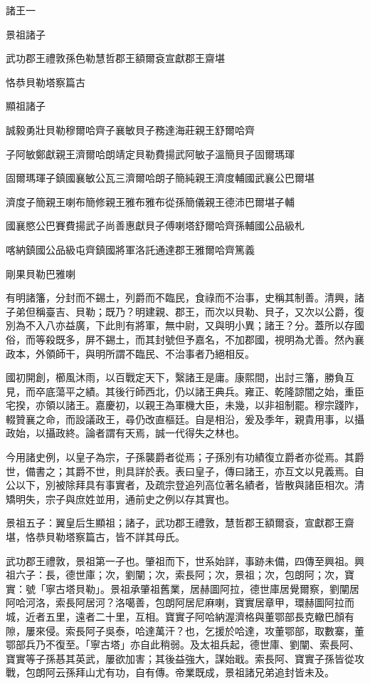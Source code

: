 
\begin{pinyinscope}
諸王一

景祖諸子

武功郡王禮敦孫色勒慧哲郡王額爾袞宣獻郡王齋堪

恪恭貝勒塔察篇古

顯祖諸子

誠毅勇壯貝勒穆爾哈齊子襄敏貝子務達海莊親王舒爾哈齊

子阿敏鄭獻親王濟爾哈朗靖定貝勒費揚武阿敏子溫簡貝子固爾瑪琿

固爾瑪琿子鎮國襄敏公瓦三濟爾哈朗子簡純親王濟度輔國武襄公巴爾堪

濟度子簡親王喇布簡修親王雅布雅布從孫簡儀親王德沛巴爾堪子輔

國襄愍公巴賽費揚武子尚善惠獻貝子傅喇塔舒爾哈齊孫輔國公品級札

喀納鎮國公品級屯齊鎮國將軍洛託通達郡王雅爾哈齊篤義

剛果貝勒巴雅喇

有明諸籓，分封而不錫土，列爵而不臨民，食祿而不治事，史稱其制善。清興，諸子弟但稱臺吉、貝勒；既乃？明建親、郡王，而次以貝勒、貝子，又次以公爵，復別為不入八亦益廣，下此則有將軍，無中尉，又與明小異；諸王？分。蓋所以存國俗，而等殺既多，屏不錫土，而其封號但予嘉名，不加郡國，視明為尤善。然內襄政本，外領師干，與明所謂不臨民、不治事者乃絕相反。

國初開創，櫛風沐雨，以百戰定天下，繄諸王是庸。康熙間，出討三籓，勝負互見，而卒底蕩平之績。其後行師西北，仍以諸王典兵。雍正、乾隆諒闇之始，重臣宅揆，亦領以諸王。嘉慶初，以親王為軍機大臣，未幾，以非祖制罷。穆宗踐阼，輟贊襄之命，而設議政王，尋仍改直樞廷。自是相沿，爰及季年，親貴用事，以攝政始，以攝政終。論者謂有天焉，誠一代得失之林也。

今用諸史例，以皇子為宗，子孫襲爵者從焉；子孫別有功績復立爵者亦從焉。其爵世，備書之；其爵不世，則具詳於表。表曰皇子，傳曰諸王，亦互文以見義焉。自公以下，別被除拜具有事實者，及疏宗登追列高位著名績者，皆散與諸臣相次。清矯明失，宗子與庶姓並用，通前史之例以存其實也。

景祖五子：翼皇后生顯祖；諸子，武功郡王禮敦，慧哲郡王額爾袞，宣獻郡王齋堪，恪恭貝勒塔察篇古，皆不詳其母氏。

武功郡王禮敦，景祖第一子也。肇祖而下，世系始詳，事跡未備，四傳至興祖。興祖六子：長，德世庫；次，劉闡；次，索長阿；次，景祖；次，包朗阿；次，寶實：號「寧古塔貝勒」。景祖承肇祖舊業，居赫圖阿拉，德世庫居覺爾察，劉闡居阿哈河洛，索長阿居河？洛噶善，包朗阿居尼麻喇，寶實居章甲，環赫圖阿拉而城，近者五里，遠者二十里，互相。寶實子阿哈納渥濟格與董鄂部長克轍巴顏有隙，屢來侵。索長阿子吳泰，哈達萬汗？也，乞援於哈達，攻董鄂部，取數寨，董鄂部兵乃不復至。「寧古塔」亦自此稍弱。及太祖兵起，德世庫、劉闡、索長阿、寶實等子孫惎其英武，屢欲加害；其後益強大，謀始戢。索長阿、寶實子孫皆從攻戰，包朗阿云孫拜山尤有功，自有傳。帝業既成，景祖諸兄弟追封皆未及。


\end{pinyinscope}
